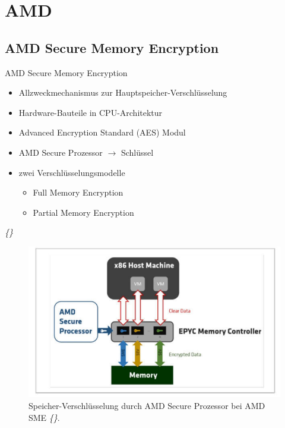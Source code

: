 \documentclass{sdqbeamer}
\begin{document}
\section{AMD}

\subsection{AMD Secure Memory Encryption}
\begin{frame}{AMD Secure Memory Encryption}
	\begin{minipage}{0.49\linewidth}
		\begin{itemize}
			\item Allzweckmechanismus zur Hauptspeicher-Verschlüsselung
			\item Hardware-Bauteile in CPU-Architektur
			\item Advanced Encryption Standard (AES) Modul
			\item AMD Secure Prozessor \(\rightarrow\) Schlüssel
			\item zwei Verschlüsselungsmodelle
			\begin{itemize}
				\item Full Memory Encryption
				\item Partial Memory Encryption
			\end{itemize}
		\end{itemize}
		\vspace{3ex}
		\vfill
		\small\textit{\{\cite{kaplan}\}}
	\end{minipage}
	\begin{minipage}{0.5\linewidth}
		\begin{figure}[!h]
			\centering
			\includegraphics[width=\linewidth]{Bilder/AMD_SMESEV.jpg}
			\caption{Speicher-Verschlüsselung durch AMD Secure Prozessor bei AMD SME \textit{\{\cite{amd}\}}. }
		\end{figure}
	\end{minipage}
\end{frame}
\end{document}

